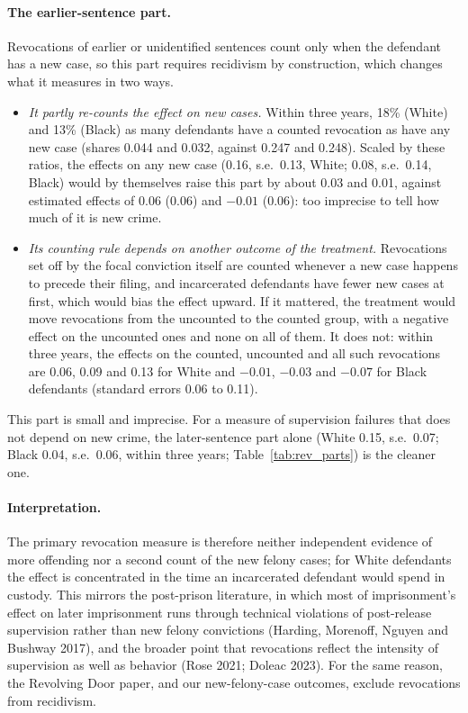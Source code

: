 \documentclass[11pt]{article}
\begin{document}
\paragraph{The earlier-sentence part.} Revocations of earlier or unidentified sentences count only when the defendant has a new case, so this part requires recidivism by construction, which changes what it measures in two ways.
\begin{itemize}
  \item \emph{It partly re-counts the effect on new cases.} Within three years, 18\% (White) and 13\% (Black) as many defendants have a counted revocation as have any new case (shares 0.044 and 0.032, against 0.247 and 0.248). Scaled by these ratios, the effects on any new case (0.16, s.e.\ 0.13, White; 0.08, s.e.\ 0.14, Black) would by themselves raise this part by about 0.03 and 0.01, against estimated effects of 0.06 (0.06) and $-0.01$ (0.06): too imprecise to tell how much of it is new crime.
  \item \emph{Its counting rule depends on another outcome of the treatment.} Revocations set off by the focal conviction itself are counted whenever a new case happens to precede their filing, and incarcerated defendants have fewer new cases at first, which would bias the effect upward. If it mattered, the treatment would move revocations from the uncounted to the counted group, with a negative effect on the uncounted ones and none on all of them. It does not: within three years, the effects on the counted, uncounted and all such revocations are 0.06, 0.09 and 0.13 for White and $-0.01$, $-0.03$ and $-0.07$ for Black defendants (standard errors 0.06 to 0.11).
\end{itemize}
This part is small and imprecise. For a measure of supervision failures that does not depend on new crime, the later-sentence part alone (White 0.15, s.e.\ 0.07; Black 0.04, s.e.\ 0.06, within three years; Table~\ref{tab:rev_parts}) is the cleaner one.

\paragraph{Interpretation.} The primary revocation measure is therefore neither independent evidence of more offending nor a second count of the new felony cases; for White defendants the effect is concentrated in the time an incarcerated defendant would spend in custody. This mirrors the post-prison literature, in which most of imprisonment's effect on later imprisonment runs through technical violations of post-release supervision rather than new felony convictions (Harding, Morenoff, Nguyen and Bushway 2017), and the broader point that revocations reflect the intensity of supervision as well as behavior (Rose 2021; Doleac 2023). For the same reason, the Revolving Door paper, and our new-felony-case outcomes, exclude revocations from recidivism.
\end{document}
